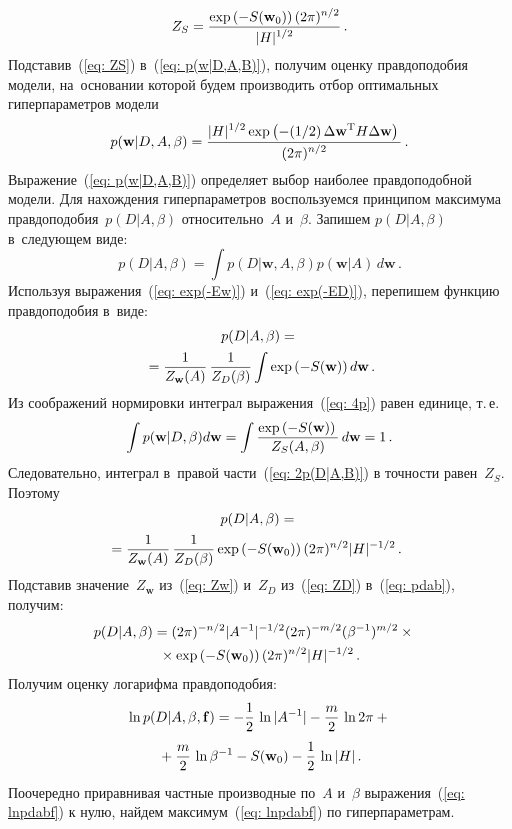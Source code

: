 \begin{multicols}{2}
\begin{equation}
Z_S=\displaystyle\frac{\displaystyle \exp\left(-S(\mathbf{w}_0)\right)(2\pi)^{{n}/{2}}\mathstrut}{\displaystyle |H|^{{1}/{2}}\mathstrut}\,.
\end{equation}
Подставив~(\ref{eq: ZS}) в~(\ref{eq: p(w|D,A,B)}), получим оценку
правдоподобия модели, на~основании которой будем производить отбор
оптимальных гиперпараметров модели
\begin{equation*}
p(\mathbf{w}|D,A,\beta)=\displaystyle\frac{\displaystyle |H|^{{1}/{2}}\exp\left(-({1}/{2})\,\Delta\mathbf{w}^{\mathrm{T}} H 
\Delta \mathbf{w}\right)\mathstrut}{\displaystyle (2\pi)^{{n}/{2}}\mathstrut}\,.
\end{equation*}
Выражение~(\ref{eq: p(w|D,A,B)}) определяет выбор наиболее
правдоподобной модели. Для нахождения ги\-пер\-па\-ра\-мет\-ров воспользуемся
принципом максимума правдоподобия~$p(D|A,\beta)$ относительно~$A$ 
и~$\beta$. Запишем $p(D|A,\beta)$ в~следующем виде:
\begin{equation*}
p(D|A,\beta)=\int p(D|\mathbf{w},A,\beta)p(\mathbf{w}|A)\,d\mathbf{w}\,.
\end{equation*}
Используя выражения~(\ref{eq: exp(-Ew)}) и~(\ref{eq: exp(-ED)}), 
перепишем функцию правдоподобия в~виде:
\begin{multline}
\label {eq: 2p(D|A,B)}
p(D|A,\beta)={}\\
{}=\displaystyle\frac{\displaystyle 1\mathstrut}{\displaystyle Z_{\mathbf{w}}(A)\mathstrut}\,\displaystyle\frac{\displaystyle 1\mathstrut}{\displaystyle Z_{D}(\beta)\mathstrut}
\int \exp\left(-S(\mathbf{w})\right)d\mathbf{w}\,.
\end{multline}
Из соображений нормировки интеграл выражения~(\ref{eq: 4p}) равен единице, т.\,е.\
$$
\int p(\mathbf{w}|D,\beta)d\mathbf{w}=\int 
\displaystyle\frac{\displaystyle \exp\left(-S(\mathbf{w})\right)\mathstrut}{\displaystyle Z_{S}(A,\beta)\mathstrut}\,d\mathbf{w}=1\,.
$$
Следовательно, интеграл в~правой части~(\ref{eq: 2p(D|A,B)}) в точ\-ности равен~$Z_S$. Поэтому
\begin{multline}
\label {eq: pdab}
p(D|A,\beta)={}\\
\hspace*{-3mm}{}=\fr{1}{Z_{\mathbf{w}}(A)}\,\fr{1}{Z_{D}(\beta)}
\exp\left(-S(\mathbf{w}_0)\right)(2\pi)^{{n}/{2}}|H|^{-{1}/{2}}\,.\!
\end{multline}
Подставив значение~$Z_\mathbf{w}$ из~(\ref{eq: Zw}) и~$Z_D$ из~(\ref{eq: ZD}) 
в~(\ref{eq: pdab}), получим:
\begin{multline*}
\hspace*{-2.5mm}p(D|A,\beta)=(2\pi)^{-{n}/{2}}|A^{-1}|^{-{1}/{2}}(2\pi)^{-{m}/{2}}(\beta^{-1})^{{m}/{2}} \times{}\\
{}\times
\exp\left(-S(\mathbf{w}_0)\right)(2\pi)^{{n}/{2}}|H|^{-{1}/{2}}\,.
\end{multline*}
Получим оценку логарифма правдоподобия:
\begin{multline}
\label {eq: lnpdabf}
\ln p(D|A,\beta,\mathbf{f})=-\displaystyle\frac{\displaystyle 1\mathstrut}{\displaystyle 2\mathstrut}\,\ln|A^{-1}|-\displaystyle\frac{\displaystyle m\mathstrut}{\displaystyle 2\mathstrut}\,\ln 2\pi + {}\\
{}+
\displaystyle\frac{\displaystyle m\mathstrut}{\displaystyle 2\mathstrut}\,\ln\beta^{-1}-S(\mathbf{w}_0)-\displaystyle\frac{\displaystyle 1\mathstrut}{\displaystyle 2\mathstrut}\,\ln|H|\,.
\end{multline}
Поочередно приравнивая частные производные по~$A$ и~$\beta$ выражения~(\ref{eq: lnpdabf}) 
к нулю, найдем максимум~(\ref{eq: lnpdabf}) по гиперпараметрам.


\end{multicols}
